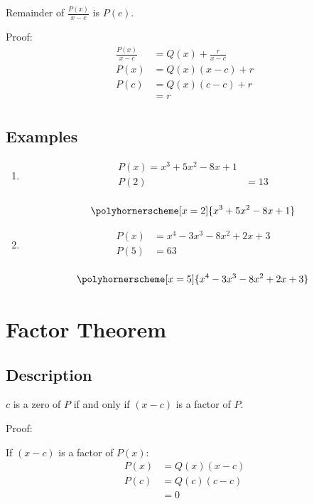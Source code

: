 \documentclass{exam}
\begin{document}
  Remainder of $\frac{P(x)}{x - c}$ is $P(c)$.

  Proof:
  \begin{align*}
    \frac{P(x)}{x - c} &= Q(x) + \frac{r}{x - c} \\
    P(x)               &= Q(x) (x - c) + r \\
    P(c)               &= Q(x) (c - c) + r \\
                       &= r \\
  \end{align*}

  \subsection{Examples}
  \begin{enumerate}

    \item 
      \begin{align*}
        P(x) = x^3 + 5 x^2 - 8 x + 1 \\
        P(2) &= 13 \\
      \end{align*}

      \[ \polyhornerscheme[x = 2]{x^3 + 5 x^2 - 8 x + 1} \]

    \item 
      \begin{align*}
        P(x) &= x^4 - 3 x^3 - 8 x^2 + 2 x + 3 \\
        P(5) &= 63 \\
      \end{align*}

      \[ \polyhornerscheme[x = 5]{x^4 - 3x^3 - 8x^2 + 2x + 3} \]

  \end{enumerate}

  \section{Factor Theorem}

  \subsection{Description}

  $c$ is a zero of $P$ if and only if $(x - c)$ is a factor of $P$.

  Proof:

  If $(x - c)$ is a factor of $P(x)$:
  \begin{align*}
    P(x) &= Q(x)(x - c) \\
    P(c) &= Q(c)(c - c) \\
         &= 0 \\
  \end{align*}
\end{document}
